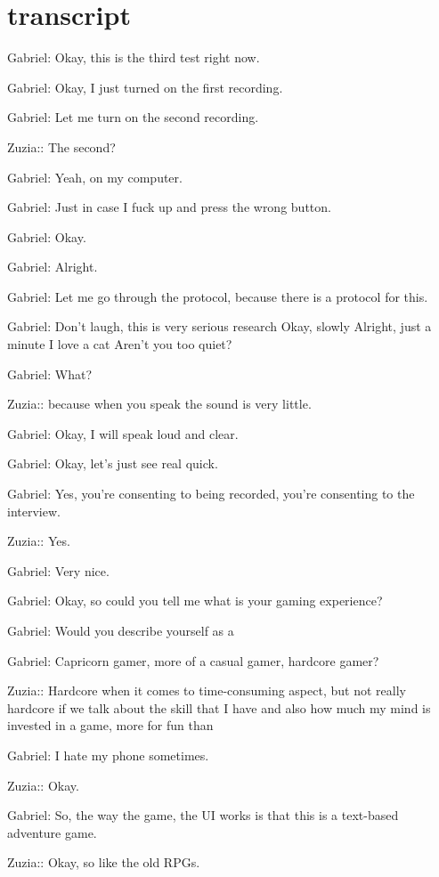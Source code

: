 
\section{transcript}

Gabriel: Okay, this is the third test right now.

Gabriel: Okay, I just turned on the first recording.

Gabriel: Let me turn on the second recording.

Zuzia:: The second?

Gabriel: Yeah, on my computer.

Gabriel: Just in case I fuck up and press the wrong button.

Gabriel: Okay.

Gabriel: Alright.

Gabriel: Let me go through the protocol, because there is a protocol for this.

Gabriel: Don't laugh, this is very serious research Okay, slowly Alright, just a minute I love a cat Aren't you too quiet?

Gabriel: What?

Zuzia:: because when you speak the sound is very little.

Gabriel: Okay, I will speak loud and clear.

Gabriel: Okay, let's just see real quick.

Gabriel: Yes, you're consenting to being recorded, you're consenting to the interview.

Zuzia:: Yes.

Gabriel: Very nice.

Gabriel: Okay, so could you tell me what is your gaming experience?

Gabriel: Would you describe yourself as a

Gabriel: Capricorn gamer, more of a casual gamer, hardcore gamer?

Zuzia:: Hardcore when it comes to time-consuming aspect, but not really hardcore if we talk about the skill that I have and also how much my mind is invested in a game, more for fun than

Gabriel: I hate my phone sometimes.

Zuzia:: Okay.

Gabriel: So, the way the game, the UI works is that this is a text-based adventure game.

Zuzia:: Okay, so like the old RPGs.

